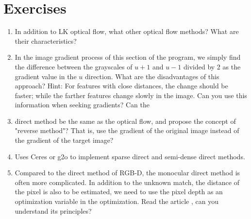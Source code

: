\section*{ Exercises}
\begin{enumerate}
\item In addition to LK optical flow, what other optical flow methods? What are their characteristics?
\item In the image gradient process of this section of the program, we simply find the difference between the grayscales of $u+1$ and $u-1$ divided by 2 as the gradient value in the $u$ direction. What are the disadvantages of this approach? Hint: For features with close distances, the change should be faster; while the farther features change slowly in the image. Can you use this information when seeking gradients?
Can the \item direct method be the same as the optical flow, and propose the concept of "reverse method"? That is, use the gradient of the original image instead of the gradient of the target image?
\item[\optional] Uses Ceres or g2o to implement sparse direct and semi-dense direct methods.
\item Compared to the direct method of RGB-D, the monocular direct method is often more complicated. In addition to the unknown match, the distance of the pixel is also to be estimated, we need to use the pixel depth as an optimization variable in the optimization. Read the article \cite{Engel2013, Engel2014}, can you understand its principles?
\end{enumerate}

